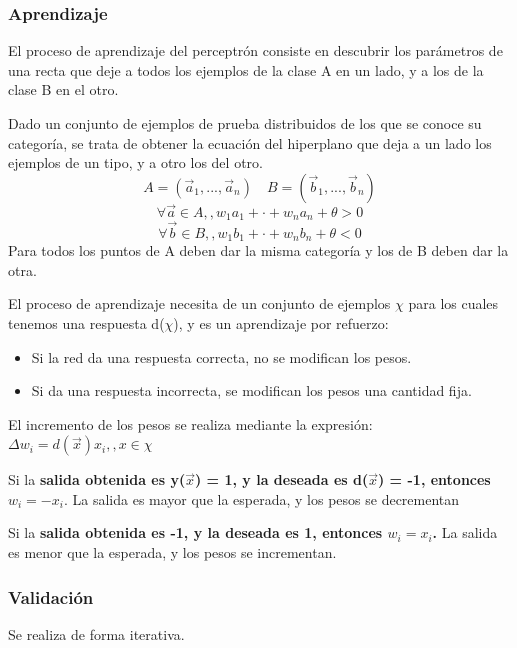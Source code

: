 \documentclass[12pt, twoside, openright]{report} %
\begin{document}
\subsubsection{Aprendizaje}
El proceso de aprendizaje del perceptrón consiste en descubrir los parámetros de una recta que deje a todos los ejemplos de la clase A en un lado, y a los de la clase B en el otro.

Dado un conjunto de ejemplos de prueba distribuidos de los que se conoce su categoría, se trata de obtener la ecuación del hiperplano que deja a un lado los ejemplos de un tipo, y a otro los del otro.
$$A=(\vec{a}_1, ..., \vec{a}_n) \quad B=(\vec{b}_1, ..., \vec{b}_n)$$
$$\forall \vec{a} \in A,, w_1a_1+\cdot+w_na_n+\theta > 0$$
$$\forall \vec{b} \in B,, w_1b_1+\cdot+w_nb_n+\theta < 0$$
Para todos los puntos de A deben dar la misma categoría y los de B deben dar la otra.
\pagebreak

El proceso de aprendizaje necesita de un conjunto de ejemplos $\chi$ para los cuales tenemos una respuesta d($\chi$), y es un aprendizaje por refuerzo:
\begin{itemize}
	\item Si la red da una respuesta correcta, no se modifican los pesos.
	\item Si da una respuesta incorrecta, se modifican los pesos una cantidad fija.
\end{itemize}

El incremento de los pesos se realiza mediante la expresión: $\Delta w_i = d(\vec{x})x_i, , x \in \chi$

Si la \textbf{salida obtenida es y($\vec{x}$) = 1, y la deseada es d($\vec{x}$) = -1, entonces $w_i = -x_i$}. La salida es mayor que la esperada, y los pesos se decrementan

Si la \textbf{salida obtenida es -1, y la deseada es 1, entonces $w_i = x_i$.} La salida es menor que la esperada, y los pesos se incrementan.

\subsubsection{Validación}
Se realiza de forma iterativa.
\end{document}

